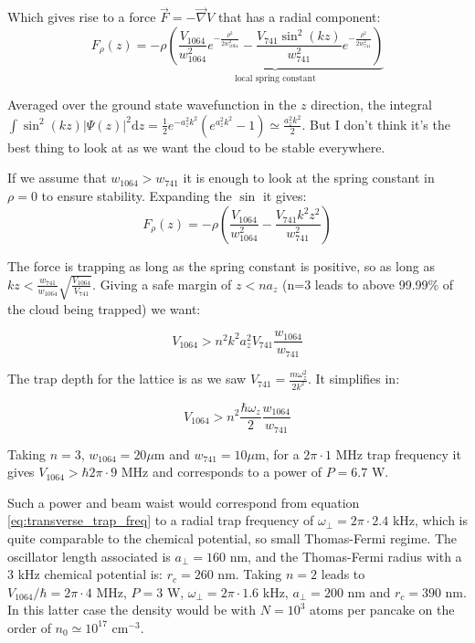 \documentclass[reprint,amsmath,amssymb,aps,nofootinbib]{revtex4-1}
\begin{document}
Which gives rise to a force $\vec{F}=-\vec{\nabla}V$ that has a radial component:
\begin{equation}
F_{\rho}(z) = -\rho\underbrace{\left(\frac{V_{1064}}{w_{1064}^{2}}e^{-\frac{\rho^{2}}{2w_{1064}^{2}}}-\frac{V_{741}\sin^{2}(kz)}{w_{741}^{2}}e^{-\frac{\rho^{2}}{2w_{741}^{2}}}\right)}_{\text{local spring constant}}
\end{equation}

Averaged over the ground state wavefunction in the $z$ direction, the integral $\int\sin^{2}(kz)|\Psi(z)|^{2}\text{d}z = \frac12 e^{-a_{z}^{2}k^{2}}(e^{a_{z}^{2}k^{2}}-1)\simeq \frac{a_{z}^{2}k^{2}}{2}$. But I don't think it's the best thing to look at as we want the cloud to be stable everywhere.

If we assume that $w_{1064}>w_{741}$ it is enough to look at the spring constant in $\rho=0$ to ensure stability. Expanding the $\sin$ it gives:
\begin{equation}
F_{\rho}(z) = -\rho\left(\frac{V_{1064}}{w_{1064}^{2}}-\frac{V_{741}k^{2}z^{2}}{w_{741}^{2}}\right)
\end{equation}

The force is trapping as long as the spring constant is positive, so as long as $kz<\frac{w_{741}}{w_{1064}}\sqrt{\frac{V_{1064}}{V_{741}}}$. Giving a safe margin of $z<na_{z}$ (n=3 leads to above 99.99\% of the cloud being trapped) we want:

\begin{equation}
V_{1064}>n^{2}k^{2}a_{z}^{2}V_{741}\frac{w_{1064}}{w_{741}}
\end{equation}

The trap depth for the lattice is as we saw $V_{741} = \frac{m\omega_{z}^{2}}{2k^{2}}$. It simplifies in:

\begin{equation}
\label{eq:constraint_depth}
V_{1064}>n^{2}\frac{\hbar\omega_{z}}{2}\frac{w_{1064}}{w_{741}}
\end{equation}

Taking $n=3$, $w_{1064}=20\mu$m and $w_{741}=10\mu$m, for a $2\pi\cdot1\text{ MHz}$ trap frequency it gives $V_{1064}>\hbar2\pi\cdot 9\text{ MHz}$ and corresponds to a power of $P=6.7$ W.

Such a power and beam waist would correspond from equation \ref{eq:transverse_trap_freq} to a radial trap frequency of $\omega_{\perp}=2\pi\cdot 2.4\text{ kHz}$, which is quite comparable to the chemical potential, so small Thomas-Fermi regime. The oscillator length associated is $a_{\perp}=160\text{ nm}$, and the Thomas-Fermi radius with a 3 kHz chemical potential is: $r_{c} = 260\text{ nm}$.
Taking $n=2$ leads to $V_{1064}/\hbar = 2\pi\cdot 4\text{ MHz}$, $P = 3$ W, $\omega_{\perp} = 2\pi\cdot 1.6$ kHz, $a_{\perp}=200\text{ nm}$ and $r_{c} = 390\text{ nm}$. In this latter case the density would be with $N=10^{3}$ atoms per pancake on the order of $n_{0} \simeq 10^{17} \text{ cm}^{-3}$.
\end{document}

